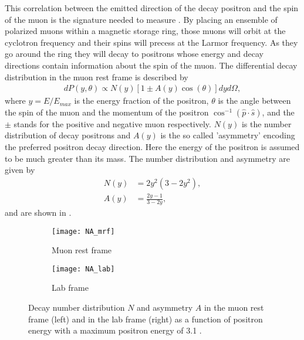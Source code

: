 This correlation between the emitted direction of the decay positron and the spin of the muon is the signature needed to measure \wa. By placing an ensemble of polarized muons within a magnetic storage ring, those muons will orbit at the cyclotron frequency and their spins will precess at the Larmor frequency. As they go around the ring they will decay to positrons whose energy and decay directions contain information about the spin of the muon. The differential decay distribution in the muon rest frame is described by \cite{Bucksbaum}
        \begin{align} \label{eq:diffdecaydist}
            dP(y, \theta) \propto N(y)[1 \pm A(y)\cos(\theta)]dy d\Omega,
        \end{align}
where $y=E/E_{max}$ is the energy fraction of the positron, $\theta$ is the angle between the spin of the muon and the momentum of the positron $\cos^{-1}(\hat{p} \cdot \hat{s})$, and the $\pm$ stands for the positive and negative muon respectively. $N(y)$ is the number distribution of decay positrons and $A(y)$ is the so called 'asymmetry' encoding the preferred positron decay direction. Here the energy of the positron is assumed to be much greater than its mass. The number distribution and asymmetry are given by \cite{Bucksbaum}
        \begin{align}
            N(y) &= 2y^{2}(3-2y^{2}), \label{eq:Nmrf} \\
            A(y) &= \frac{2y-1}{3-2y}, \label{eq:Amrf}
        \end{align}
and are shown in . 

\begin{figure}[]
\centering
    \begin{subfigure}[]{0.45\textwidth}
        \centering
        \texttt{[image: NA\_mrf]}
        \caption{Muon rest frame}
    \label{fig:NA2mrf}
    \end{subfigure}%
    \hspace{1cm}
    \begin{subfigure}[]{0.45\textwidth}
        \centering
        \texttt{[image: NA\_lab]}
        \caption{Lab frame}
    \label{fig:NA2lab}    
    \end{subfigure}
\caption[Number distribution and asymmetry for muon decay in the muon rest frame and lab frame]{Decay number distribution $N$ and asymmetry $A$ in the muon rest frame (left) and in the lab frame (right) as a function of positron energy with a maximum positron energy of 3.1 \GeV.}
\label{fig:NA2}
\end{figure}

